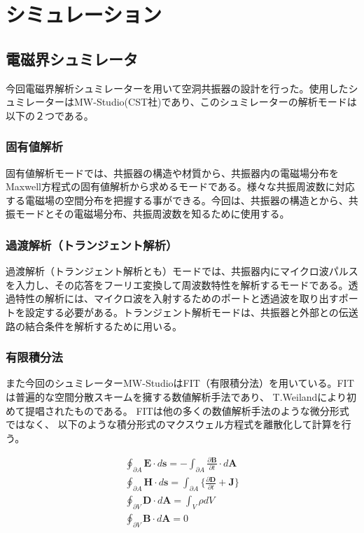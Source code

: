 \chapter{シミュレーション}

\section{電磁界シュミレータ}
今回電磁界解析シュミレーターを用いて空洞共振器の設計を行った。使用したシュミレーターはMW-Studio(CST社)\cite{CST}であり、このシュミレーターの解析モードは以下の２つである。\cite{MWS-1}

\subsection*{固有値解析}
固有値解析モードでは、共振器の構造や材質から、共振器内の電磁場分布をMaxwell方程式の固有値解析から求めるモードである。様々な共振周波数に対応する電磁場の空間分布を把握する事ができる。今回は、共振器の構造とから、共振モードとその電磁場分布、共振周波数を知るために使用する。

\subsection*{過渡解析（トランジェント解析）}
過渡解析（トランジェント解析とも）モードでは、共振器内にマイクロ波パルスを入力し、その応答をフーリエ変換して周波数特性を解析するモードである。透過特性の解析には、マイクロ波を入射するためのポートと透過波を取り出すポートを設定する必要がある。トランジェント解析モードは、共振器と外部との伝送路の結合条件を解析するために用いる。

\subsection*{有限積分法}
また今回のシュミレーターMW-StudioはFIT（有限積分法）を用いている。\cite{MWS-2}FITは普遍的な空間分散スキームを擁する数値解析手法であり、
T.Weilandにより初めて提唱された\cite{FIT}ものである。
FITは他の多くの数値解析手法のような微分形式ではなく、
以下のような積分形式のマクスウェル方程式を離散化して計算を行う。

\begin{eqnarray}
  \oint_{\partial A} \mathbf{E} \cdot d\mathbf{s}
  = - \int_{\partial A} \frac{\partial \mathbf{B}}{\partial t} \cdot d  \mathbf{A}\\
  \oint_{\partial A} \mathbf{H} \cdot d\mathbf{s} =  \int_{\partial A} \{ \frac{\partial \mathbf{D}}{\partial t} + \mathbf{J} \} \\
  \oint_{\partial V} \mathbf{D} \cdot d\mathbf{A} = \int_V \rho dV \\
  \oint_{\partial V} \mathbf{B} \cdot d\mathbf{A} = 0
\end{eqnarray}

